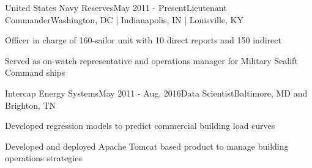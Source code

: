 




\begin{rSubsection}{United States Navy Reserves}{May 2011 - Present}{Lieutenant Commander}{Washington, DC | Indianapolis, IN | Louisville, KY}
\item Officer in charge of 160-sailor unit with 10 direct reports and 150 indirect
\item Served as on-watch representative and operations manager for Military Sealift Command ships 
\end{rSubsection}


\begin{rSubsection}{Intercap Energy Systems}{May 2011 - Aug. 2016}{Data Scientist}{Baltimore, MD and Brighton, TN}
\item Developed regression models to predict commercial building load curves
\item Developed and deployed Apache Tomcat based product to manage building operations strategies
\end{rSubsection}

